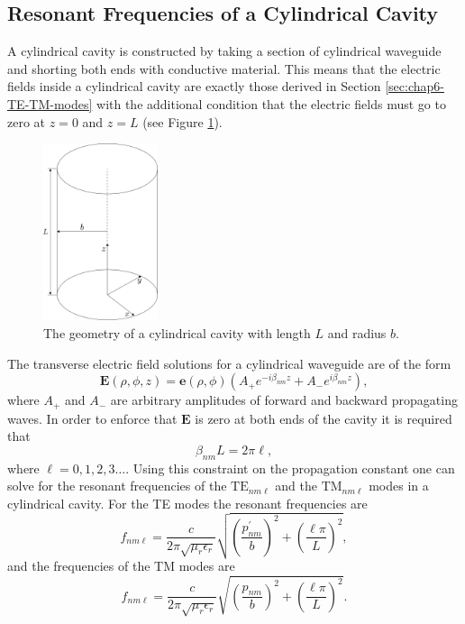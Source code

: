 \subsection{Resonant Frequencies of a Cylindrical Cavity}

A cylindrical cavity is constructed by taking a section of cylindrical waveguide and shorting both ends with conductive material. This means that the electric fields inside a cylindrical cavity are exactly those derived in Section \ref{sec:chap6-TE-TM-modes} with the additional condition that the electric fields must go to zero at $z=0$ and $z=L$ (see Figure \ref{fig:chap6-cyl-cav}).
\begin{figure}[htbp]
    \centering
    \includegraphics*[width=0.3\textwidth]{figs/Chapter-6/230606_cylindrical_cavity.png}
    \caption{\label{fig:chap6-cyl-cav} The geometry of a cylindrical cavity with length $L$ and radius $b$.}
\end{figure}

The transverse electric field solutions for a cylindrical waveguide are of the form
\begin{equation}
    \bm{E}(\rho,\phi,z)=\bm{e}(\rho,\phi)\left(A_+e^{-i\beta_{nm}z}+A_-e^{i\beta_{nm}z }\right),
\end{equation}
where $A_+$ and $A_-$ are arbitrary amplitudes of forward and backward propagating waves. In order to enforce that $\bm{E}$ is zero at both ends of the cavity it is required that 
\begin{equation}
    \beta_{nm}L = 2\pi \ell,
\end{equation}
where $\ell=0,1,2,3\ldots$. Using this constraint on the propagation constant one can solve for the resonant frequencies of the $\mathrm{TE}_{nm\ell}$ and the $\mathrm{TM}_{nm\ell}$ modes in a cylindrical cavity. For the TE modes the resonant frequencies are
\begin{equation}
    f_{nm\ell}=\frac{c}{2\pi\sqrt{\mu_r\epsilon_r}}\sqrt{\left(\frac{p_{nm}^\prime}{b}\right)^2+\left(\frac{\ell\pi}{L}\right)^2},
\end{equation}
and the frequencies of the TM modes are 
\begin{equation}
    f_{nm\ell}=\frac{c}{2\pi\sqrt{\mu_r\epsilon_r}}\sqrt{\left(\frac{p_{nm}}{b}\right)^2+\left(\frac{\ell\pi}{L}\right)^2}.
\end{equation}

